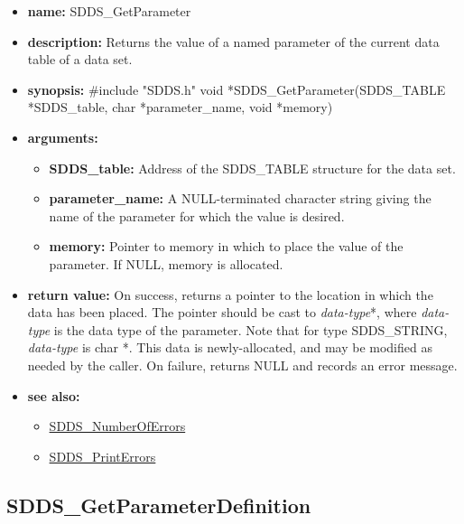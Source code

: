 \documentclass[11pt]{article}
\newcommand{\progref}[1]{\hyperref{SDDS_#1}{{\tt SDDS\_#1} (}{)}{SDDS_#1}}
\begin{document}
\begin{itemize}
\item {\bf name:}\newline
SDDS\_GetParameter
\item {\bf description:}\newline
Returns the value of a named parameter of the current data table of a data set.
\item {\bf synopsis:} \#include "SDDS.h"\newline
void *SDDS\_GetParameter(SDDS\_TABLE *SDDS\_table, char *parameter\_name, void *memory)
\item {\bf arguments:}
\begin{itemize}
\item {\bf SDDS\_table:} Address of the SDDS\_TABLE structure for the data set.
\item {\bf parameter\_name:} A NULL-terminated character string giving the name of the parameter for which the value is desired.
\item {\bf memory:} Pointer to memory in which to place the value of the parameter. If NULL, memory is allocated.
\end{itemize}
\item {\bf return value:}\newline
On success, returns a pointer to the location in which the data has been placed. The pointer should be cast to {\em data-type}*, where {\em data-type} is the data type of the parameter. Note that for type SDDS\_STRING, {\em data-type} is char *. This data is newly-allocated, and may be modified as needed by the caller. On failure, returns NULL and records an error message.
\item {\bf see also:}
\begin{itemize}
\item \progref{NumberOfErrors}
\item \progref{PrintErrors}
\end{itemize}
\end{itemize}

\subsection{SDDS\_GetParameterDefinition}
\label{SDDS_GetParameterDefinition}
\end{document}
